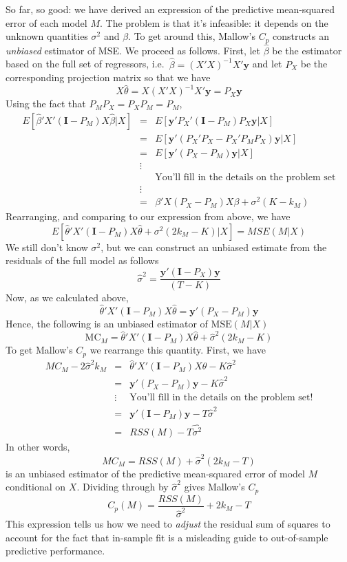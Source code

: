 \documentclass[12pt]{article}
\theoremstyle{definition}
\begin{document}
So far, so good: we have derived an expression of the predictive mean-squared error of each model $M$. The problem is that it's infeasible: it depends on the unknown quantities $\sigma^2$ and $\beta$. To get around this, Mallow's $C_p$ constructs an \emph{unbiased} estimator of MSE. We proceed as follows. First, let $\widehat{\beta}$ be the estimator based on the full set of regressors, i.e.\ $\widehat{\beta} = (X'X)^{-1}X'\mathbf{y}$ and let $P_{X}$ be the corresponding projection matrix so that we have 
		$$X \widehat{\theta} = X(X'X)^{-1}X'\mathbf{y} = P_{X}\mathbf{y}$$
Using the fact that $P_MP_X = P_XP_M = P_M$, 
	\begin{eqnarray*}
		E\left[\widehat{\beta}'X'(\mathbf{I} - P_M)X\widehat{\beta} |X\right] &=& E\left[\mathbf{y}'P_X'(\mathbf{I} - P_M)P_{X}\mathbf{y} |X\right]\\
			&=& E\left[\mathbf{y}'(P_X'P_X - P_X'P_MP_X)\mathbf{y} |X\right]\\
			&=& E\left[\mathbf{y}'(P_X - P_M)\mathbf{y} |X\right]\\
			&\vdots& \\
			&&\boxed{\mbox{You'll fill in the details on the problem set}}\\  
			&\vdots& \\
			&=& \beta'X(P_X - P_M)X\beta +  \sigma^2 (K - k_M) 
	\end{eqnarray*}
Rearranging, and comparing to our expression from above, we have 
	$$E[\widehat{\theta}'X'(\mathbf{I} - P_M)X\widehat{\theta} +\sigma^2( 2k_M -  K)|X] = MSE(M|X)$$
We still don't know $\sigma^2$, but we can construct an unbiased estimate from the residuals of the full model as follows
	$$\widehat{\sigma}^2 = \frac{\mathbf{y}'(\mathbf{I} - P_X)\mathbf{y}}{(T-K)}$$
Now, as we calculated above,
	$$\widehat{\theta}'X'(\mathbf{I} - P_M)X\widehat{\theta} = \textbf{y}'(P_X - P_M)\textbf{y}$$
Hence, the following is an unbiased estimator of $\mbox{MSE}(M|X)$
	$$\mbox{MC}_M = \widehat{\theta}'X'(\mathbf{I} - P_M)X\widehat{\theta} +\widehat{\sigma}^2( 2k_M -  K)$$
To get Mallow's $C_p$ we rearrange this quantity. First, we have
\begin{eqnarray*}
	MC_M - 2\widehat{\sigma}^2k_M &=& \widehat{\theta}'X'(\mathbf{I} - P_M)X\widehat{\theta} - K\widehat{\sigma}^2\\
	&=& \mathbf{y}'(P_X - P_M)\mathbf{y} -  K\widehat{\sigma}^2\\
		&\vdots& \mbox{You'll fill in the details on the problem set!}\\
			&=& \mathbf{y}'(\mathbf{I} - P_M)\mathbf{y} - T\widehat{\sigma}^2\\
			&=& RSS(M) - T\widehat{\sigma^2}
\end{eqnarray*}
In other words,
	$$MC_M = RSS(M) + \widehat{\sigma}^2(2 k_M - T)$$
is an unbiased estimator of the predictive mean-squared error of model $M$ conditional on $X$. 
Dividing through by $\widehat{\sigma}^2$ gives Mallow's $C_p$
	$$C_p(M) = \frac{RSS(M)}{\widehat{\sigma}^2} + 2k_M - T$$
This expression tells us how we need to \emph{adjust} the residual sum of squares to account for the fact that in-sample fit is a misleading guide to out-of-sample predictive performance.
\end{document}

